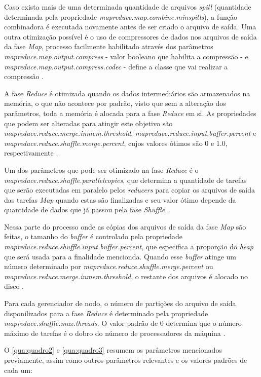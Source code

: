 Caso exista mais de uma determinada quantidade de arquivos \textit{spill} (quantidade determinada pela propriedade \textit{mapreduce.map.combine.minspills}), a função combinadora é executada novamente antes de ser criado o arquivo de saída. Uma outra otimização possível é o uso de compressores de dados nos arquivos de saída da fase \textit{Map}, processo facilmente habilitado através dos parâmetros \textit{mapreduce.map.output.compress} - valor booleano que habilita a compressão - e \textit{mapreduce.map.output.compress.codec} - define a classe que vai realizar a compressão \cite{HadoopBook15}.

A fase \textit{Reduce} é otimizada quando os dados intermediários são armazenados na memória, o que não acontece por padrão, visto que sem a alteração dos parâmetros, toda a memória é alocada para a fase \textit{Reduce} em si. As propriedades que podem ser alteradas para atingir este objetivo são \textit{mapreduce.reduce.merge.inmem.threshold}, \textit{mapreduce.reduce.input.buffer.percent} e \textit{mapreduce.reduce.shuffle.merge.percent}, cujos valores ótimos são 0 e 1.0, respectivamente \cite{HadoopBook15}.

Um dos parâmetros que pode ser otimizado na fase \textit{Reduce} é o \textit{mapreduce.reduce.shuffle.parallelcopies}, que determina a quantidade de tarefas que serão executadas em paralelo pelos \textit{reducers} para copiar os arquivos de saída das tarefas \textit{Map} quando estas são finalizadas e seu valor ótimo depende da quantidade de dados que já passou pela fase \textit{Shuffle} \cite{MRONLINELi14}.

Nessa parte do processo onde as cópias dos arquivos de saída da fase \textit{Map} são feitas, o tamanho do \textit{buffer} é controlado pela propriedade \textit{mapreduce.reduce.shuffle.input.buffer.percent}, que especifica a proporção do \textit{heap} que será usada para a finalidade mencionda. Quando esse \textit{buffer} atinge um número determinado por \textit{mapreduce.reduce.shuffle.merge.percent} ou \textit{mapreduce.reduce.merge.inmem.threshold}, o restante dos arquivos é alocado no disco \cite{HadoopBook15}.

Para cada gerenciador de nodo, o número de partições do arquivo de saída disponilizados para a fase \textit{Reduce} é determinado pela propriedade \textit{mapreduce.shuffle.max.threads}. O valor padrão de 0 determina que o número máximo de tarefas é o dobro do número de processadores da máquina \cite{ProHadoop09}.

O \autoref{qua:quadro2} e \autoref{qua:quadro3} resumem os parâmetros mencionados previamente, assim como outros parâmetros relevantes e os valores padrões de cada um:

